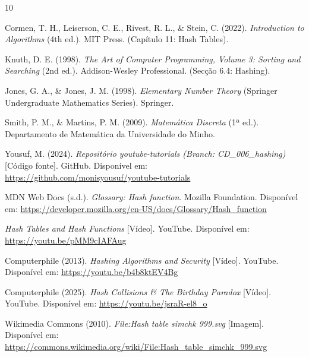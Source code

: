 \documentclass[12pt, a4paper]{article}
\begin{document}
\begin{thebibliography}{10}

Cormen, T. H., Leiserson, C. E., Rivest, R. L., \& Stein, C. (2022). \textit{Introduction to Algorithms} (4th ed.). MIT Press. (Capítulo 11: Hash Tables).

Knuth, D. E. (1998). \textit{The Art of Computer Programming, Volume 3: Sorting and Searching} (2nd ed.). Addison-Wesley Professional. (Secção 6.4: Hashing).

Jones, G. A., \& Jones, J. M. (1998). \textit{Elementary Number Theory} (Springer Undergraduate Mathematics Series). Springer.

Smith, P. M., \& Martins, P. M. (2009). \textit{Matemática Discreta} (1ª ed.). Departamento de Matemática da Universidade do Minho.

Yousuf, M. (2024). \textit{Repositório youtube-tutorials (Branch: CD\_006\_hashing)} [Código fonte]. GitHub. Disponível em: \url{https://github.com/monisyousuf/youtube-tutorials}

MDN Web Docs (s.d.). \textit{Glossary: Hash function}. Mozilla Foundation. Disponível em: \url{https://developer.mozilla.org/en-US/docs/Glossary/Hash_function}

\textit{Hash Tables and Hash Functions} [Vídeo]. YouTube. Disponível em: \url{https://youtu.be/pMM9cIAFAug}

Computerphile (2013). \textit{Hashing Algorithms and Security} [Vídeo]. YouTube. Disponível em: \url{https://youtu.be/b4b8ktEV4Bg}

Computerphile (2025). \textit{Hash Collisions \& The Birthday Paradox} [Vídeo]. YouTube. Disponível em: \url{https://youtu.be/jsraR-el8_o}

Wikimedia Commons (2010). \textit{File:Hash table simchk 999.svg} [Imagem]. Disponível em: \url{https://commons.wikimedia.org/wiki/File:Hash_table_simchk_999.svg}

\end{thebibliography}
\end{document}
